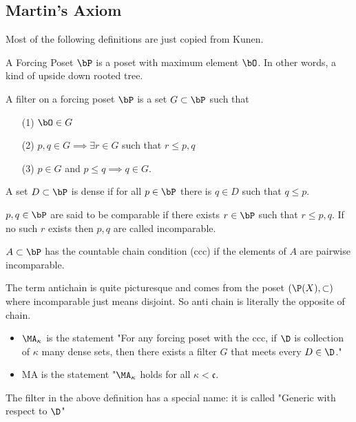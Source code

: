 \documentclass{article}
\begin{document}
\subsection{Martin's Axiom}
Most of the following definitions are just copied from Kunen.
\begin{defn}
    A Forcing Poset \(\bP\) is a poset with maximum element \(\bO\). In other words, a kind of upside down rooted tree.
\end{defn}
\begin{defn}
    A filter on a forcing poset \(\bP\) is a set \(G \subset \bP\) such that 
    \begin{enumerate}
        \item[(1)] \(\bO \in G\)
        \item[(2)] \(p,q \in G \implies \exists r \in G\) such that \(r \leq p, q\)
        \item[(3)] \(p \in G\) and \(p \leq q \implies q \in G\).
    \end{enumerate}
\end{defn}
\begin{defn}
    A set \(D \subset \bP\) is dense if for all \(p \in \bP\) there is \(q \in D\) such that \(q \leq p\).
\end{defn}
\begin{defn}
    \(p, q \in \bP\) are said to be comparable if there exists \(r \in \bP\) such that \(r \leq p, q\). If no such \(r\) exists then \(p, q\) are called incomparable.

    \(A \subset \bP\) has the countable chain condition (ccc) if the elements of \(A\) are pairwise incomparable.
\end{defn}
The term antichain is quite picturesque and comes from the poset \((\P(X), \subset)\) where incomparable just means disjoint. So anti chain is literally the opposite of chain.
\begin{defn}
    \leavevmode
    \begin{itemize}
        \item \(\MA_{\kappa}\) is the statement "For any forcing poset with the ccc, if \(\D\) is collection of \(\kappa\) many dense sets, then there exists a filter \(G\) that meets every \(D \in \D\)."
        \item MA is the statement "\(\MA_{\kappa}\) holds for all \(\kappa < \mathfrak{c}\).
    \end{itemize}
\end{defn}
 The filter in the above definition has a special name: it is called "Generic with respect to \(\D\)"
\end{document}
